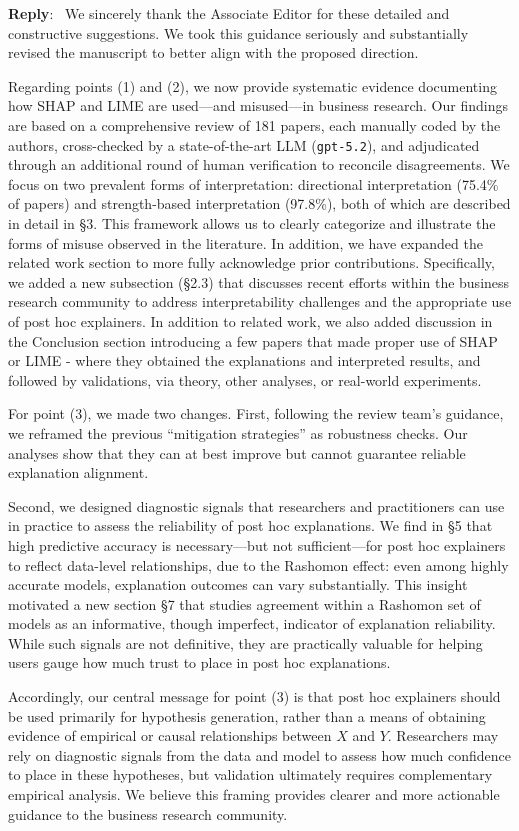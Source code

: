 \documentclass[11pt]{article}
\newcounter{se}[section]
\newcounter{reviewer}
\newcounter{point}[reviewer]
\newenvironment{reply}
 {\par\medskip \noindent \begin{sf}\textbf{Reply}:\ }
 {\medskip \end{sf}}
\begin{document}
\begin{reply}
We sincerely thank the Associate Editor for these detailed and constructive suggestions. We took this guidance seriously and substantially revised the manuscript to better align with the proposed direction.

Regarding points (1) and (2), we now provide systematic evidence documenting how SHAP and LIME are used—and misused—in business research. Our findings are based on a comprehensive review of 181 papers, each manually coded by the authors, cross-checked by a state-of-the-art LLM (\texttt{gpt-5.2}), and adjudicated through an additional round of human verification to reconcile disagreements. We focus on two prevalent forms of interpretation: directional interpretation (75.4\% of papers) and strength-based interpretation (97.8\%), both of which are described in detail in \S 3. This framework allows us to clearly categorize and illustrate the forms of misuse observed in the literature. In addition, we have expanded the related work section to more fully acknowledge prior contributions. Specifically, we added a new subsection (\S 2.3) that discusses recent efforts within the business research community to address interpretability challenges and the appropriate use of post hoc explainers. In addition to related work, we also added discussion in the Conclusion section introducing a few papers that made proper use of SHAP or LIME - where they obtained the explanations and interpreted results, and followed by validations, via theory, other analyses, or real-world experiments.


For point (3), we made two changes. First, following the review team’s guidance, we reframed the previous “mitigation strategies” as robustness checks. Our analyses show that they can at best improve but cannot guarantee reliable explanation alignment.

Second, we designed diagnostic signals that researchers and practitioners can use in practice to assess the reliability of post hoc explanations.  We find  in \S 5 that high predictive accuracy is necessary—but not sufficient—for post hoc explainers to reflect data-level relationships, due to the Rashomon effect: even among highly accurate models, explanation outcomes can vary substantially. This insight motivated a new section \S 7 that studies agreement within a Rashomon set of models as an informative, though imperfect, indicator of explanation reliability. While such signals are not definitive, they are practically valuable for helping users gauge how much trust to place in post hoc explanations.

Accordingly, our central message for point (3) is that post hoc explainers should be used primarily for hypothesis generation, rather than a means of obtaining evidence of empirical or causal relationships between $X$ and $Y$. Researchers may rely on diagnostic signals from the data and model to assess how much confidence to place in these hypotheses, but validation ultimately requires complementary empirical analysis. We believe this framing provides clearer and more actionable guidance to the business research community.
\end{reply}
\end{document}
